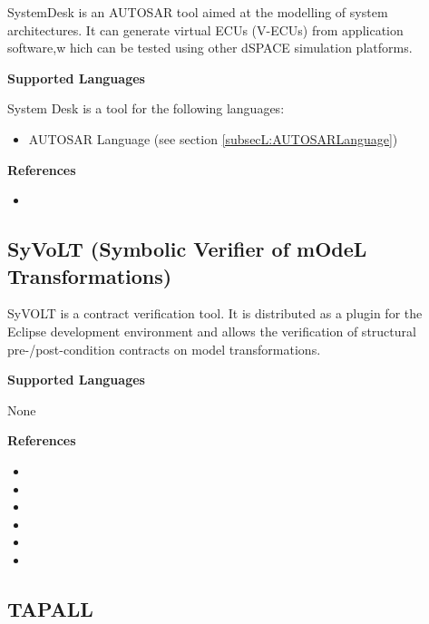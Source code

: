 SystemDesk is an AUTOSAR tool aimed at the modelling of system architectures. It can generate virtual ECUs (V-ECUs) from application software,w hich can be tested using other dSPACE simulation platforms.

\textbf{Supported Languages}

System Desk is a tool for the following languages:
\begin{itemize}
	\item AUTOSAR Language (see section \ref{subsecL:AUTOSARLanguage})
\end{itemize}


\textbf{References}
\begin{itemize}
	
\item {}
\end{itemize}



\subsection{SyVoLT (Symbolic Verifier of mOdeL Transformations)}
\label{subsecT:SyVoLT}


SyVOLT is a contract verification tool. It is distributed as a plugin for the Eclipse development environment and allows the verification of structural pre-/post-condition contracts on model transformations.

\textbf{Supported Languages}

None


\textbf{References}
\begin{itemize}
	
\item {}
	
\item {}
	
\item {}
	
\item {}
	
\item {}
	
\item {}
\end{itemize}



\subsection{TAPALL}
\label{subsecT:TAPALL}


